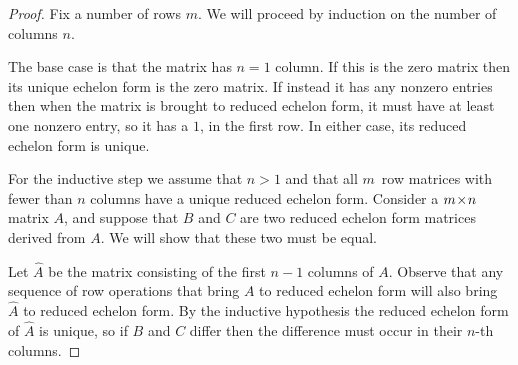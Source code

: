 \begin{proof} \cite{Yuster}
Fix a number of rows \( m \).
We will proceed by induction on the number of columns \( n \).

The base case is that the matrix has \( n=1 \) column.
If this is the zero matrix then its unique echelon form is the zero matrix. 
If instead it has any nonzero entries then when the matrix is brought to 
reduced echelon form, it must have at least one nonzero entry, so it has a
\( 1 \), in the first row. 
In either case, its reduced echelon form is unique.

For the inductive step we assume that \( n>1 \) and that all \( m \)~row
matrices with fewer than \( n \) columns have a unique reduced echelon form.
Consider a \( m \! \times \! n \) matrix \( A \), and suppose that 
\( B \) and \( C \) are two reduced echelon form matrices derived from \( A \).
We will show that these two must be equal.

Let \( \hat{A} \) be the matrix consisting of the first \( n-1 \) columns of
\( A \).
Observe that any sequence of row operations that bring \( A \) to reduced 
echelon form will also bring \( \hat{A} \) to reduced echelon form.
By the inductive hypothesis the reduced echelon form of \( \hat{A} \)
is unique, so if \( B \) and \( C \) differ then the difference must 
occur in their \( n \)-th columns.


\end{proof}
